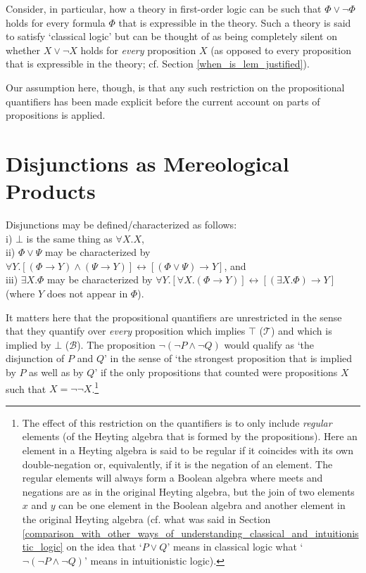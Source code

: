 \documentclass[12pt]{book}
\begin{document}
Consider, in particular, how a theory in first-order logic can be such that $\Phi \vee \neg \Phi$ holds for every formula $\Phi$ that is expressible in the theory. Such a theory is said to satisfy `classical logic' but can be thought of as being completely silent on whether $X \vee \neg X$ holds for \textit{every} proposition $X$ (as opposed to every proposition that is expressible in the theory; cf. Section \ref{when_is_lem_justified}).

Our assumption here, though, is that any such restriction on the propositional quantifiers has been made explicit before the current account on parts of propositions is applied.

\section{Disjunctions as Mereological Products}  \label{disjunctions_as_mereological_products}
Disjunctions may be defined/characterized as follows:\\
i) $\bot$ is the same thing as $\forall X.X$,\\
ii) $\Phi \vee \Psi$ may be characterized by $\forall Y.[(\Phi \rightarrow Y) \wedge (\Psi \rightarrow Y)] \leftrightarrow [(\Phi \vee \Psi) \rightarrow Y]$, and\\
iii) $\exists X.\Phi$  may be characterized by $\forall Y.[\forall X.(\Phi \rightarrow Y)] \leftrightarrow [(\exists X.\Phi) \rightarrow Y]$ (where $Y$ does not appear in $\Phi$).

It matters here that the propositional quantifiers are unrestricted in the sense that they quantify over \textit{every} proposition which implies $\top$ ($\mathcal{T}$) and which is implied by $\bot$ ($\mathcal{B}$). The proposition $\neg (\neg P \wedge \neg Q)$ would qualify as `the disjunction of $P$ and $Q$' in the sense of `the strongest proposition that is implied by $P$ as well as by $Q$' if the only propositions that counted were propositions $X$ such that $X = \neg \neg X$.\footnote{
The effect of this restriction on the quantifiers is to only include \textit{regular} elements (of the Heyting algebra that is formed by the propositions). Here an element in a Heyting algebra is said to be regular if it coincides with its own double-negation or, equivalently, if it is the negation of an element. The regular elements will always form a Boolean algebra where meets and negations are as in the original Heyting algebra, but the join of two elements $x$ and $y$ can be one element in the Boolean algebra and another element in the original Heyting algebra (cf. what was said in Section \ref{comparison_with_other_ways_of_understanding_classical_and_intuitionistic_logic} on the idea that `$P \vee Q$' means in classical logic what `$\neg (\neg P \wedge \neg Q)$' means in intuitionistic logic).}
\end{document}

